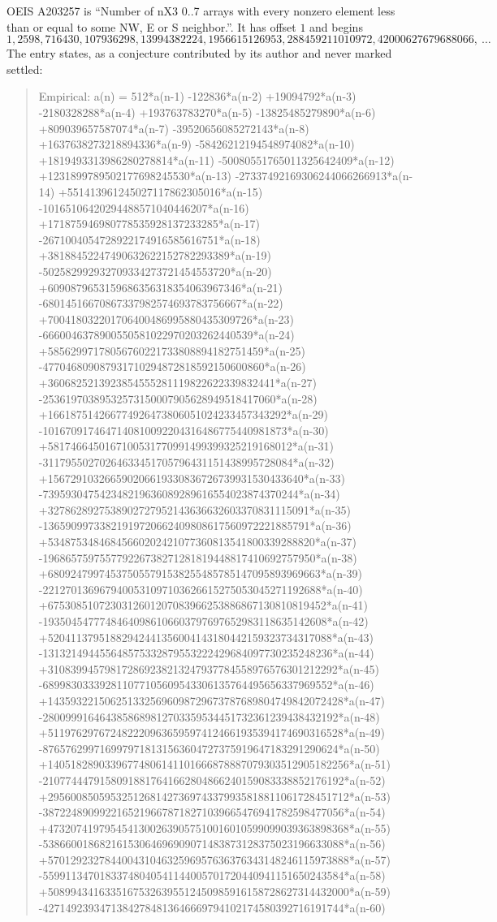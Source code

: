 \documentclass[11pt,a4paper]{article}
\theoremstyle{plain}
\theoremstyle{definition}
\begin{document}
OEIS A203257 is ``Number of nX3 0..7 arrays with every nonzero element less than or equal to some NW, E or S neighbor.''. It has offset $1$ and begins
\[
1, 2598, 716430, 107936298, 13994382224, 1956615126953, 288459211010972, 42000627679688066,\ \dots
\]
The entry states, as a conjecture contributed by its author and never marked settled:
\begin{quote}\raggedright\small
Empirical: a(n) = 512*a(n-1) -122836*a(n-2) +19094792*a(n-3) -2180328288*a(n-4) +193763783270*a(n-5) -13825485279890*a(n-6) +809039657587074*a(n-7) -39520656085272143*a(n-8) +1637638273218894336*a(n-9) -58426212194548974082*a(n-10) +1819493313986280278814*a(n-11) -50080551765011325642409*a(n-12) +1231899789502177698245530*a(n-13) -27337492169306244066266913*a(n-14) +551413961245027117862305016*a(n-15) -10165106420294488571040446207*a(n-16) +171875946980778535928137233285*a(n-17) -2671004054728922174916585616751*a(n-18) +38188452247490632622152782293389*a(n-19) -502582992932709334273721454553720*a(n-20) +6090879653159686356318354063967346*a(n-21) -68014516670867337982574693783756667*a(n-22) +700418032201706400486995880435309726*a(n-23) -6660046378900550581022970203262440539*a(n-24) +58562997178056760221733808894182751459*a(n-25) -477046809087931710294872818592150600860*a(n-26) +3606825213923854555281119822622339832441*a(n-27) -25361970389532573150007905628949518417060*a(n-28) +166187514266774926473806051024233457343292*a(n-29) -1016709174647140810092204316486775440981873*a(n-30) +5817466450167100531770991499399325219168012*a(n-31) -31179550270264633451705796431151438995728084*a(n-32) +156729103266590206619330836726739931530433640*a(n-33) -739593047542348219636089289616554023874370244*a(n-34) +3278628927538902727952143636632603370831115091*a(n-35) -13659099733821919720662409808617560972221885791*a(n-36) +53487534846845660202421077360813541800339288820*a(n-37) -196865759755779226738271281819448817410692757950*a(n-38) +680924799745375055791538255485785147095893969663*a(n-39) -2212701369679400531097103626615275053045271192688*a(n-40) +6753085107230312601207083966253886867130810819452*a(n-41) -19350454777484640986106603797697652983118635142608*a(n-42) +52041137951882942441356004143180442159323734317088*a(n-43) -131321494455648575332879553222429684097730235248236*a(n-44) +310839945798172869238213247937784558976576301212292*a(n-45) -689983033392811077105609543306135764495656337969552*a(n-46) +1435932215062513325696098729673787689804749842072428*a(n-47) -2800999164643858689812703359534451732361239438432192*a(n-48) +5119762976724822209636595974124661935394174690316528*a(n-49) -8765762997169979718131563604727375919647183291290624*a(n-50) +14051828903396774806141101666878887079303512905182256*a(n-51) -21077444791580918817641662804866240159083338852176192*a(n-52) +29560085059532512681427369743379935818811061728451712*a(n-53) -38722489099221652196678718271039665476941782598477056*a(n-54) +47320741979545413002639057510016010599099039363898368*a(n-55) -53866001868216153064696909071483873128375023196633088*a(n-56) +57012923278440043104632596957636376343148246115973888*a(n-57) -55991134701833748040541144005701720440941151650243584*a(n-58) +50899434163351675326395512450985916158728627314432000*a(n-59) -42714923934713842784813646669794102174580392716191744*a(n-60) 
\end{quote}
\end{document}
